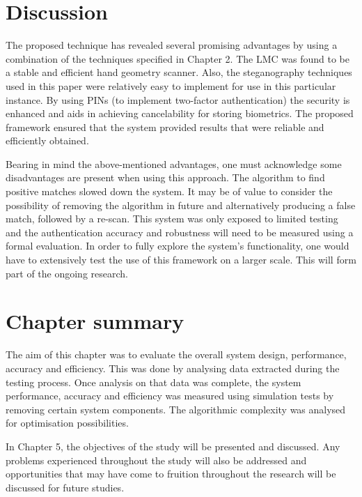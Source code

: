 \section{Discussion}

The proposed technique has revealed several promising advantages by using a combination of the techniques specified in Chapter 2. The LMC was found to be a stable and efficient hand geometry scanner. Also, the steganography techniques used in this paper were relatively easy to implement for use in this particular instance. By using PINs (to implement two-factor authentication) the security is enhanced and aids in achieving cancelability for storing biometrics. The proposed framework ensured that the system provided results that were reliable and efficiently obtained.

Bearing in mind the above-mentioned advantages, one must acknowledge some disadvantages are present when using this approach. The algorithm to find positive matches slowed down the system. It may be of value to consider the possibility of removing the algorithm in future and alternatively producing a false match, followed by a re-scan. This system was only exposed to limited testing and the authentication accuracy and robustness will need to be measured using a formal evaluation. In order to fully explore the system’s functionality, one would have to extensively test the use of this framework on a larger scale. This will form part of the ongoing research.


\section{Chapter summary}

The aim of this chapter was to evaluate the overall system design, performance, accuracy and efficiency. This was done by analysing data extracted during the testing process. Once analysis on that data was complete, the system performance, accuracy and efficiency was measured using simulation tests by removing certain system components. The algorithmic complexity was analysed for optimisation possibilities.

In Chapter 5, the objectives of the study will be presented and discussed. Any problems experienced throughout the study will also be addressed and opportunities that may have come to fruition throughout the research will be discussed for future studies.